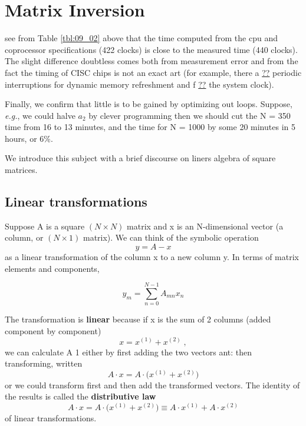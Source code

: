 
\section{Matrix Inversion}
 see from Table \ref{tbl:09_02} above that the time computed from the
cpu and coprocessor specifications (422 clocks) is close to the
measured time (440 clocks). The slight difference doubtless
comes both from measurement error and from the fact the
timing of CISC chips is not an exact art (for example, there a \underline{??}
periodic interruptions for dynamic memory refreshment and f \underline{??}
the system clock).

Finally, we confirm that little is to be gained by optimizing out
loops. Suppose, \textit{e.g.}, we could halve $a_2$ by clever programming
then we should cut the N = 350 time from 16 to 13 minutes, and 
the time for N = 1000 by some 20 minutes in 5 hours, or 6\%.

We introduce this subject with a brief discourse on liners
algebra of square matrices.

\subsection{Linear transformations}
Suppose A is a square $(N\times N)$ matrix and x is an N-dimensional
vector (a column, or $(N\times 1)$ matrix). We can think of the symbolic
operation
\begin{equation}
    \label{eq:09_26}
    y= A -x
\end{equation} 
as a linear transformation of the column x to a new column y. In
terms of matrix elements and components,

\begin{equation}
    \label{eq:09_27}
    y_m = \sum_{n=0}^{N-1} A_{mn} x_n
\end{equation}

The transformation is \textbf{linear} because if x is the sum of 2 columns
(added component by component)
\begin{equation}
    \label{eq:09_28}
    x=x^{(1)}+x^{(2)}\;,
\end{equation}
we can calculate A 1 either by first adding the two vectors ant:
then transforming, written
\begin{equation}
    \label{eq:09_29}
    A \cdot x = A \cdot \Big( x^{(1)}+x^{(2)} \Big)
\end{equation}
or we could transform first and then add the transformed vectors.
The identity of the results is called the \textbf{distributive law}
\begin{equation}
    \label{eq:09_30}
    A \cdot x = A \cdot \Big( x^{(1)}+x^{(2)} \Big) \equiv   A \cdot x^{(1)}+ A \cdot x^{(2)} 
\end{equation}
of linear transformations.

